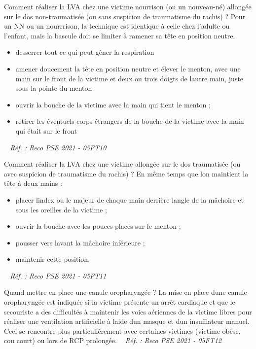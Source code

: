 \documentclass[grid,avery5371,landscape]{flashcards}
\makeatletter
\newcounter{nocarte}
\newcommand{\categ}[1]{%
  \def\@categ{#1}%
  \setcounter{nocarte}{0}%
}
\newcommand{\source}[1]{%
  \medskip
  \itshape%
   ~ \hfill Réf. : #1}
\makeatother
\begin{document}
\color[HTML]{003273}
\categ{PSE}
\begin{flashcard}[geste]{
 Comment réaliser la LVA chez une victime nourrison (ou un nouveau-né) allongée sur le dos non-traumatisée (ou sans suspicion de traumatisme du rachis) ?   }
  Pour un NN ou un nourrrison, la technique est identique à celle chez l'adulte ou l'enfant, mais la bascule doit se limiter à ramener sa tête en position neutre.\begin{itemize}
\item desserrer tout ce qui peut gêner la respiration
\item amener doucement la tête en position neutre et élever le menton, avec une main sur le front de la victime et deux ou trois doigts de lautre main, juste sous la pointe du menton
\item ouvrir la bouche de la victime avec la main qui tient le menton ;
\item  retirer les éventuels corps étrangers  de la bouche de la victime avec la main qui était sur le front
\end{itemize}
  \source{Reco PSE 2021 - 05FT10}
\end{flashcard}


\color[HTML]{003273}
\categ{PSE}
\begin{flashcard}[geste]{
 Comment réaliser la LVA chez une victime allongée sur le dos traumatisée (ou avec suspicion de traumatisme du rachis) ?   }
  En même temps que lon maintient la tête à deux mains :
\begin{itemize}
\item placer lindex ou le majeur de chaque main derrière langle de la mâchoire et sous les oreilles de la victime ;
\item ouvrir la bouche avec les pouces placés sur le menton ;
\item pousser vers lavant la mâchoire inférieure ;
\item maintenir cette position.
\end{itemize}
  \source{Reco PSE 2021 - 05FT11}
\end{flashcard}


\color[HTML]{003273}
\categ{PSE}
\begin{flashcard}[CAT]{
 Quand mettre en place une canule oropharyngée ?   }
  La mise en place dune canule oropharyngée est indiquée si la victime présente un arrêt cardiaque et que le secouriste a des difficultés à maintenir les voies aériennes de la victime libres pour réaliser une ventilation
artificielle à laide dun masque et dun insufflateur manuel. Ceci se rencontre plus particulièrement avec certaines victimes (victime obèse, cou court) ou lors de RCP prolongée.
  \source{Reco PSE 2021 - 05FT12}
\end{flashcard}
\end{document}
